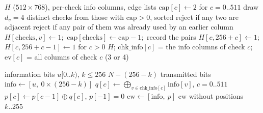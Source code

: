 \begin{algorithm}[H]
\caption{\textsc{IraBuild} (\texttt{ldpc.\_build}): the parity-check matrix $H = [H_u \,|\, H_{\mathrm{acc}}]$, seed 20260816.}
\label{alg:ira_build}
\begin{algorithmic}[1]
\Ensure $H$ ($512 \times 768$), per-check info columns, edge lists
\State $\mathrm{cap}[c] \gets 2$ for $c = 0..511$ 
 
    \Repeat {}
        \State draw $d_v = 4$ distinct checks from those with $\mathrm{cap} > 0$, sorted
        \State reject if any two are adjacent 
        \State reject if any pair of them was already used by an earlier column 
    \State $H[\text{checks}, v] \gets 1$;\ $\mathrm{cap}[\text{checks}] \gets \mathrm{cap} - 1$;\ record the pairs
\EndFor
\State $H[c, 256 + c] \gets 1$;\quad $H[c, 256 + c - 1] \gets 1$ for $c > 0$ 
\State \Return $H$; $\mathrm{chk\_info}[c]$ = the info columns of check $c$; $\mathrm{ev}[c]$ = all columns of check $c$ (3 or 4)
\end{algorithmic}
\end{algorithm}

\begin{algorithm}[H]
\caption{\textsc{LdpcEncode} (\texttt{LDPCCodec.encode}) with shortening.}
\label{alg:ldpc_enc}
\begin{algorithmic}[1]
\Require information bits $u[0..k)$, $k \le 256$
\Ensure $N - (256 - k)$ transmitted bits
\State $\mathrm{info} \gets [u,\ 0 \times (256 - k)]$ 
\State $q[c] \gets \bigoplus_{v \in \mathrm{chk\_info}[c]} \mathrm{info}[v]$, $c = 0..511$ 
\State $p[c] \gets p[c{-}1] \oplus q[c]$, $p[-1] = 0$ 
\State $\mathrm{cw} \gets [\mathrm{info},\ p]$
\State \Return $\mathrm{cw}$ without positions $k..255$ 
\end{algorithmic}
\end{algorithm}

